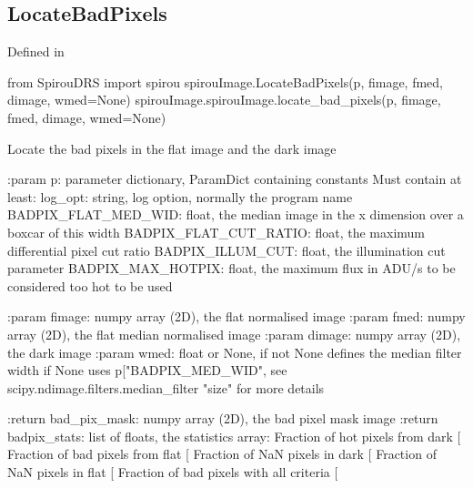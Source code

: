 \begin{minipage}{\textwidth}
\subsection{LocateBadPixels}

Defined in \spirouImage{}

\begin{pythonbox}
from SpirouDRS import spirou
spirouImage.LocateBadPixels(p, fimage, fmed, dimage, wmed=None)
spirouImage.spirouImage.locate_bad_pixels(p, fimage, fmed, dimage, wmed=None)
\end{pythonbox}

\begin{pythondocstring}
Locate the bad pixels in the flat image and the dark image

:param p: parameter dictionary, ParamDict containing constants
    Must contain at least:
            log_opt: string, log option, normally the program name
            BADPIX_FLAT_MED_WID: float, the median image in the x
                                 dimension over a boxcar of this width
            BADPIX_FLAT_CUT_RATIO: float, the maximum differential pixel
                                   cut ratio
            BADPIX_ILLUM_CUT: float, the illumination cut parameter
            BADPIX_MAX_HOTPIX: float, the maximum flux in ADU/s to be
                               considered too hot to be used

:param fimage: numpy array (2D), the flat normalised image
:param fmed: numpy array (2D), the flat median normalised image
:param dimage: numpy array (2D), the dark image
:param wmed: float or None, if not None defines the median filter width
             if None uses p["BADPIX_MED_WID", see
             scipy.ndimage.filters.median_filter "size" for more details

:return bad_pix_mask: numpy array (2D), the bad pixel mask image
:return badpix_stats: list of floats, the statistics array:
                        Fraction of hot pixels from dark [%
                        Fraction of bad pixels from flat [%
                        Fraction of NaN pixels in dark [%
                        Fraction of NaN pixels in flat [%
                        Fraction of bad pixels with all criteria [%
\end{pythondocstring}
\end{minipage}


